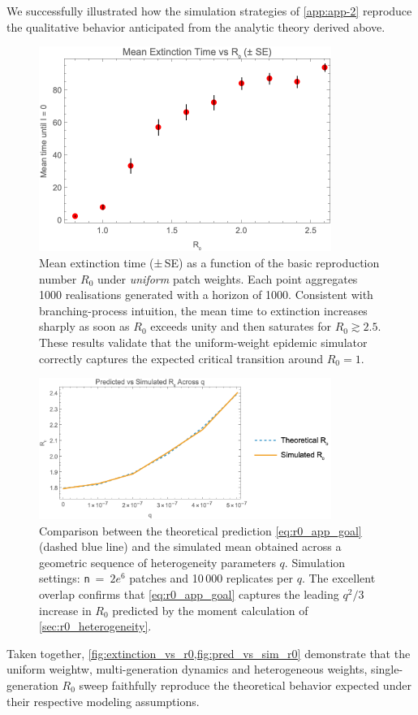 We successfully illustrated how the simulation strategies of \cref{app:app-2} reproduce the qualitative behavior anticipated from the analytic theory derived above.

\begin{figure}[h]
  \centering
  \includegraphics[width=0.85\textwidth]{figs/si/r0-simulations/extinction-time-vs-r0.png}%
  \caption{Mean extinction time (±\,SE) as a function of the basic reproduction number $R_{0}$ under \emph{uniform} patch weights. Each point aggregates 1000 realisations generated with a horizon of 1000. Consistent with branching-process intuition, the mean time to extinction increases sharply as soon as $R_{0}$ exceeds unity and then saturates for $R_{0}\gtrsim 2.5$. These results validate that the uniform-weight epidemic simulator correctly captures the expected critical transition around $R_{0}=1$.}
  \label{fig:extinction_vs_r0}
\end{figure}

\begin{figure}[h]
  \centering
  \includegraphics[width=0.85\textwidth]{figs/si/r0-simulations/predicted-vs-simulated-r0-with-q.png}%
  \caption{Comparison between the theoretical prediction \eqref{eq:r0_app_goal} (dashed blue line) and the simulated mean obtained across a geometric sequence of heterogeneity parameters $q$. Simulation settings: \texttt{n}~=~$2e^6$ patches and 10\,000 replicates per $q$. The excellent overlap confirms that \eqref{eq:r0_app_goal} captures the leading $q^{2}/3$ increase in $R_{0}$ predicted by the moment calculation of \ref{sec:r0_heterogeneity}.}
  \label{fig:pred_vs_sim_r0}
\end{figure}

\medskip
Taken together, \cref{fig:extinction_vs_r0,fig:pred_vs_sim_r0} demonstrate that the uniform weightw, multi-generation dynamics and heterogeneous weights, single-generation $R_{0}$ sweep faithfully reproduce the theoretical behavior expected under their respective modeling assumptions.
